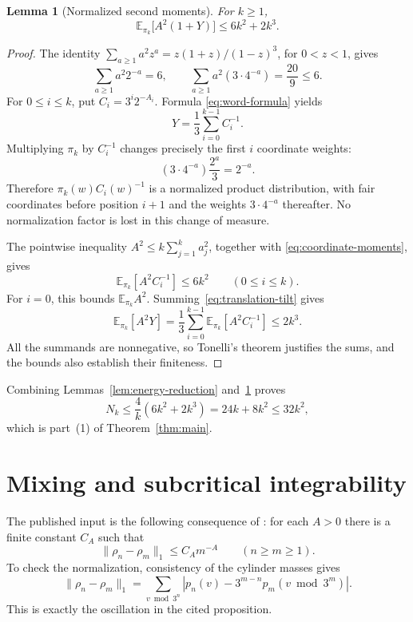 \documentclass[11pt]{article}
\newtheorem{lemma}[theorem]{Lemma}
\theoremstyle{remark}
\newcommand{\E}{\mathbb E}
\newcommand{\norm}[2]{\lVert #1\rVert_{#2}}
\begin{document}
\begin{lemma}[Normalized second moments]\label{lem:moment}
For \(k\geq1\),
\begin{equation}\label{eq:moment-bound}
  \E_{\pi_k}\bigl[A^2(1+Y)\bigr]\leq6k^2+2k^3.
\end{equation}
\end{lemma}

\begin{proof}
The identity
\(\sum_{a\geq1}a^2z^a=z(1+z)/(1-z)^3\), for \(0<z<1\),
gives
\begin{equation}\label{eq:coordinate-moments}
  \sum_{a\geq1}a^2 2^{-a}=6,\qquad
  \sum_{a\geq1}a^2(3\cdot4^{-a})=\frac{20}{9}\leq6.
\end{equation}
For \(0\leq i\leq k\), put \(C_i=3^i2^{-A_i}\).  Formula
\eqref{eq:word-formula} yields
\begin{equation}\label{eq:translation-tilt}
  Y=\frac13\sum_{i=0}^{k-1}C_i^{-1}.
\end{equation}
Multiplying \(\pi_k\) by \(C_i^{-1}\) changes precisely the
first \(i\) coordinate weights:
\[
  (3\cdot4^{-a})\frac{2^a}{3}=2^{-a}.
\]
Therefore \(\pi_k(w)C_i(w)^{-1}\) is a normalized product
distribution, with fair coordinates before position \(i+1\) and
the weights \(3\cdot4^{-a}\) thereafter.  No normalization factor
is lost in this change of measure.

The pointwise inequality
\(A^2\leq k\sum_{j=1}^k a_j^2\), together with
\eqref{eq:coordinate-moments}, gives
\[
  \E_{\pi_k}[A^2C_i^{-1}]\leq6k^2
       \qquad(0\leq i\leq k).
\]
For \(i=0\), this bounds \(\E_{\pi_k}A^2\).
Summing~\eqref{eq:translation-tilt} gives
\[
  \E_{\pi_k}[A^2Y]
  =\frac13\sum_{i=0}^{k-1}\E_{\pi_k}[A^2C_i^{-1}]
  \leq2k^3.
\]
All the summands are nonnegative, so Tonelli's theorem justifies the
sums, and the bounds also establish their finiteness.
\end{proof}

Combining Lemmas~\ref{lem:energy-reduction} and~\ref{lem:moment}
proves
\[
  N_k\leq\frac4k(6k^2+2k^3)=24k+8k^2\leq32k^2,
\]
which is part~(1) of Theorem~\ref{thm:main}.

\section{Mixing and subcritical integrability}

The published input is the following consequence of
\cite[Proposition~1.14, equations~(1.26)--(1.27)]{Tao}:
for each \(A>0\) there is a finite constant \(C_A\) such that
\begin{equation}\label{eq:mixing}
  \norm{\rho_n-\rho_m}{1}\leq C_A m^{-A}
  \qquad(n\geq m\geq1).
\end{equation}
To check the normalization, consistency of the cylinder masses gives
\[
  \norm{\rho_n-\rho_m}{1}
  =\sum_{v\bmod3^n}
       \left|p_n(v)-3^{m-n}p_m(v\bmod3^m)\right|.
\]
This is exactly the oscillation in the cited proposition.
\end{document}
